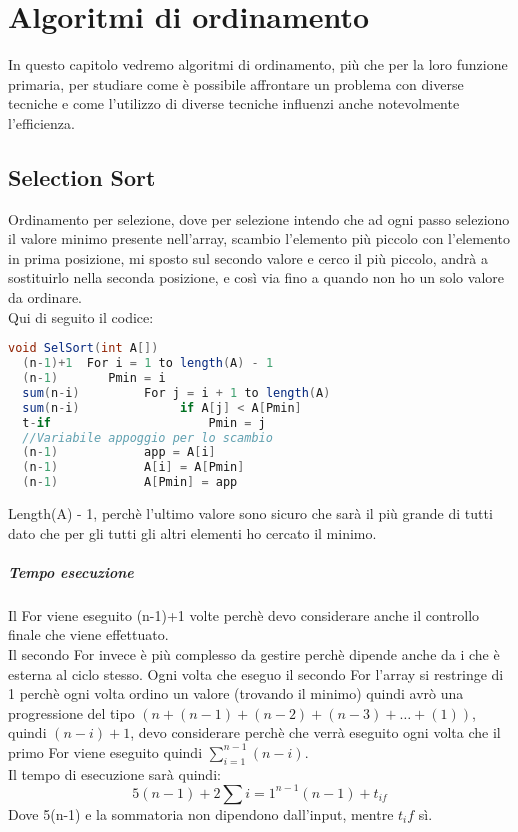 \chapter{Algoritmi di ordinamento}
In questo capitolo vedremo algoritmi di ordinamento, più che per la loro
funzione primaria, per studiare come è possibile affrontare un problema con diverse
tecniche e come l'utilizzo di diverse tecniche influenzi anche notevolmente l'efficienza.
\section{Selection Sort}
Ordinamento per selezione, dove per selezione intendo che ad ogni passo seleziono
il valore minimo presente nell'array, scambio l'elemento più piccolo con l'elemento in
prima posizione, mi sposto sul secondo valore e cerco il più piccolo, andrà a sostituirlo
nella seconda posizione, e così via fino a quando non ho un solo valore da ordinare.\\
Qui di seguito il codice:
\begin{lstlisting}[language=Java]
void SelSort(int A[])
  (n-1)+1  For i = 1 to length(A) - 1
  (n-1)       Pmin = i
  sum(n-i)         For j = i + 1 to length(A)
  sum(n-i)              if A[j] < A[Pmin]
  t-if                      Pmin = j
  //Variabile appoggio per lo scambio
  (n-1)            app = A[i] 
  (n-1)            A[i] = A[Pmin]
  (n-1)            A[Pmin] = app
\end{lstlisting}
Length(A) - 1, perchè l'ultimo valore sono sicuro che sarà il più grande di tutti
dato che per gli tutti gli altri elementi ho cercato il minimo.\\
\paragraph*{Tempo esecuzione} Il For viene eseguito (n-1)+1 volte perchè devo
considerare anche il controllo finale che viene effettuato.\\
Il secondo For invece è più complesso da gestire perchè dipende anche da i che è esterna
al ciclo stesso. Ogni volta che eseguo il secondo For l'array si restringe di 1 perchè ogni
volta ordino un valore (trovando il minimo) quindi avrò una progressione del tipo $(n + (n-1) +
(n-2) + (n-3) + \dots + (1))$, quindi $(n-i) + 1 $, devo considerare perchè che verrà eseguito
ogni volta che il primo For viene eseguito quindi $\sum_{i=1}^{n-1}(n-i)$.\\
Il tempo di esecuzione sarà quindi:
\begin{equation*}
    5(n-1) + 2\sum{i=1}^{n-1} (n-1) + t_{if}
\end{equation*}
Dove 5(n-1) e la sommatoria non dipendono dall'input, mentre $t_if$ sì.
